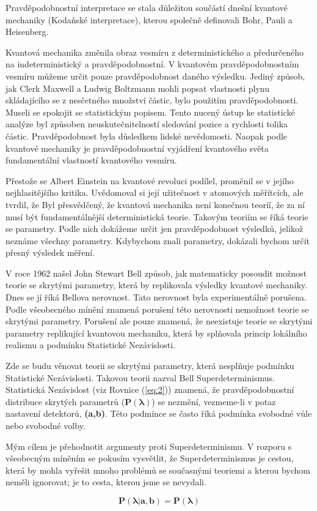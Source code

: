 Pravděpodobnostní interpretace se stala důležitou součástí dnešní kvantové mechaniky (Kodaňské interpretace), kterou společně definovali Bohr, Pauli a Heisenberg.

Kvantová mechanika změnila obraz vesmíru z deterministického a předurčeného na indeterministický a pravděpodobnostní. V kvantovém pravděpodobnostním vesmíru můžeme určit pouze pravděpodobnost daného výsledku. Jediný způsob, jak Clerk Maxwell a Ludwig Boltzmann mohli popsat vlastnosti plynu skládajícího se z nesčetného množství částic, bylo použitím pravděpodob\-nosti. Museli se spokojit se statistickým popisem. Tento nucený ústup ke statistické analýze byl způsoben neuskutečnitelností sledování pozice a rychlosti tolika částic. Pravděpodob\-nost byla důsledkem lidské nevědomosti. Naopak podle kvantové mechaniky je pravděpodobnost\-ní vyjádření kvantového světa fundamentální vlastností kvantového vesmíru.

Přestože se Albert Einstein na kvantové revoluci podílel, proměnil se v jejího nejhlasitějšího kritika. Uvědomoval si její užitečnost v atomových měřítcích, ale tvrdil, že  Byl přesvědčený, že kvantová mechanika není konečnou teoríí, že za ní musí být fundamentálnější deterministická teorie. Takovým teoriím se říká teorie se  parametry. Podle nich dokážeme určit jen pravděpodobnost výsledků, jelikož neznáme všechny parametry. Kdybychom znali  parametry, dokázali bychom určit přesný výsledek měření.

V roce 1962 našel John Stewart Bell způsob, jak matematicky posoudit možnost teorie se skrytými parametry, která by replikovala výsledky kvantové mechaniky. Dnes se jí říká Bellova nerovnost. Tato nerovnost byla experimentálně porušena. Podle všeobecného mínění znamená porušení této nerovnosti nemožnost teorie se skrytými parametry. Porušení ale pouze znamená, že neexistuje teorie se skrytými parametry replikující kvantovou mechaniku, která by splňovala princip lokálního realismu a podmínku Statistické Nezávislosti.

Zde se budu věnovat teorii se skrytými parametry, která nesplňuje podmínku Statistické Nezávislosti. Takovou teorii nazval Bell Superdeterminismus. Statistická Nezávislost (viz Rovnice (\ref{eq:2})) znamená, že pravděpodobnostní distribuce skrytých parametrů ($\bm{P(\lambda)}$) se nezmění, vezmeme-li v potaz nastavení detektorů, \textbf{(a,b)}. Této podmínce se často říká podmín\-ka svobodné vůle nebo svobodné volby. 

Mým cílem je přehodnotit argumenty proti Superdeterminismu. V rozporu s všeobecným míněním se pokusím vysvětlit, že Superdeterminismus je cestou, která by mohla vyřešit mnoho problémů se současnými teoriemi a kterou bychom neměli ignorovat; je to cesta, kterou jsme se nevydali.

\begin{equation}
    \bm{P(\lambda|\bm{a},\bm{b}) = P(\lambda)} 
    \label{eq:2}
\end{equation}

